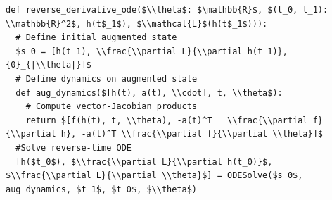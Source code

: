 \documentclass[border=10pt]{standalone}
\begin{document}
\begin{lstlisting}
def reverse_derivative_ode($\\theta$: $\mathbb{R}$, $(t_0, t_1): \\mathbb{R}^2$, h(t$_1$), $\\mathcal{L}$(h(t$_1$))):
  # Define initial augmented state
  $s_0 = [h(t_1), \\frac{\\partial L}{\\partial h(t_1)}, {0}_{|\\theta|}]$ 
  # Define dynamics on augmented state
  def aug_dynamics($[h(t), a(t), \\cdot], t, \\theta$):
    # Compute vector-Jacobian products
    return $[f(h(t), t, \\theta), -a(t)^T   \\frac{\\partial f}{\\partial h}, -a(t)^T \\frac{\\partial f}{\\partial \\theta}]$ 
  #Solve reverse-time ODE
  [h($t_0$), $\\frac{\\partial L}{\\partial h(t_0)}$, $\\frac{\\partial L}{\\partial \\theta}$] = ODESolve($s_0$, aug_dynamics, $t_1$, $t_0$, $\\theta$)
\end{lstlisting}
\end{document}
